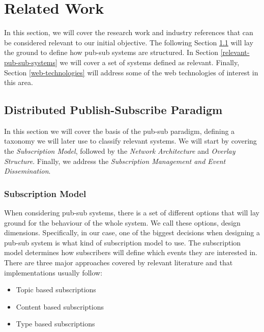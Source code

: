 
\chapter{Related Work}
\label{chapter:related-work}

In this section, we will cover the research work and industry references that
can be considered relevant to our initial objective. The following Section
\ref{distributed-publish-subscribe-paradigm} will lay the ground to define how
pub-sub systems are structured. In Section \ref{relevant-pub-sub-systems} we
will cover a set of systems defined as relevant. Finally, Section
\ref{web-technologies} will address some of the web technologies of interest in
this area.

\section{Distributed Publish-Subscribe
Paradigm}\label{distributed-publish-subscribe-paradigm}

In this section we will cover the basis of the pub-sub paradigm, defining a
taxonomy we will later use to classify relevant systems. We will start by
covering the \emph{Subscription Model}, followed by the \emph{Network
Architecture} and \emph{Overlay Structure}. Finally, we
address the \emph{Subscription Management and Event Dissemination}.

\subsection{Subscription Model}\label{subscription-model}

When considering pub-sub systems, there is a set of different options that will
lay ground for the behaviour of the whole system. We call these options, design
dimensions. Specifically, in our case, one of the biggest decisions when
designing a pub-sub system is what kind of subscription model to use. The
subscription model determines how subscribers will define which events they are
interested in. There are three major approaches covered by relevant literature
\cite{Kermarrec2013} \cite{Eugster2003} and that implementations usually
follow:

\begin{itemize}
  \item
    Topic based subscriptions
  \item
    Content based subscriptions
  \item
    Type based subscriptions
\end{itemize}

